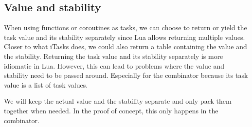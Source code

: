 \subsection{Value and stability}
When using functions or coroutines as tasks, we can choose to return or yield the task value and its stability separately since Lua allows returning multiple values. Closer to what iTasks does, we could also return a table containing the value and the stability. Returning the task value and its stability separately is more idiomatic in Lua. However, this can lead to problems where the value and stability need to be passed around. Especially for the  combinator because its task value is a list of task values.

We will keep the actual value and the stability separate and only pack them together when needed. In the proof of concept, this only happens in the  combinator.
